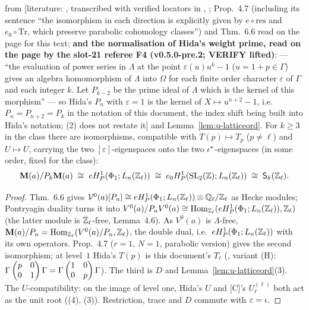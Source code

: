 \documentclass[11pt]{article}
\newcommand{\LIT}[1]{\textsf{[literature: #1]}}   %
\newcommand{\VERIFYloc}{\textsf{VERIFY}}          %
\newcommand{\Iw}{\Lambda}                         %
\newcommand{\Pk}[1]{P_{#1}}                       %
\newcommand{\Zl}{\Z_\ell}
\newcommand{\Ql}{\Q_\ell}
\begin{document}
\begin{proposition}\label{prop:u-lmsymcontrol}
\PROVED{} from \LIT{\cite[Thm.~3.1, p.~562; Lemma~4.6, p.~571; Prop.~4.7, p.~572; Thm.~6.6, p.~590]{hida_invent}, transcribed with verified locators in \HA{thm:hidacontrol},
\HA{thm:hidaweight}; Prop.~4.7 (including its sentence ``the isomorphism in each direction is explicitly given by $e\circ\mathrm{res}$ and $e_0\circ\mathrm{Tr}$, which preserve parabolic
cohomology classes'') and Thm.~6.6 read on the page for this text; \textbf{and the normalisation of Hida's weight prime, read on the page by the slot-21 referee F4
(v0.5.0-pre.2; \VERIFYloc{} lifted)}: \cite[p.~545, Introduction]{hida_invent} --- ``the evaluation of power series in $\Lambda$ at the point $\varepsilon(u)u^{k}-1$ ($u=1+p\in\Gamma$)
gives an algebra homomorphism of $\Lambda$ into $\Omega$ for each finite order character $\varepsilon$ of $\Gamma$ and each integer $k$. Let $P_{k-2}$ be the prime ideal of $\Lambda$ which is
the kernel of this morphism'' --- so Hida's $P_n$ with $\varepsilon=1$ is the kernel of $X\mapsto u^{n+2}-1$, i.e.\ $P_n=\Pk{n+2}=\Pk{k}$ in the notation of this document, the index shift
being built into Hida's notation; \HA{thm:hidacontrol}(2) does not restate it} and Lemma~\ref{lem:u-latticeord}. For $k\ge3$ in the class there are isomorphisms, compatible with $T(p)\mapsto T_p$ ($p\ne\ell$) and $U\mapsto U$, carrying the two
$[\varepsilon]$-eigenspaces onto the two $\iota^{\ast}$-eigenspaces (in some order, fixed for the class):
\[
  \mathbf M(a)/\Pk{k}\mathbf M(a)\;\cong\;eH^{1}_{P}(\Phi_1;L_n(\Zl))\;\cong\;e_0H^{1}_{P}(\SL_2(\Z);L_n(\Zl))\;\cong\;\mathsf S_k(\Zl).
\]
\end{proposition}

\begin{proof}
Thm.~6.6 gives $\mathcal V^{0}(a)[P_n]\cong eH^{1}_{P}(\Phi_1;L_n(\Zl))\otimes\Ql/\Zl$ as Hecke modules; Pontryagin duality turns it into $V^{0}(a)/P_nV^{0}(a)\cong
\Hom_{\Zl}(eH^{1}_{P}(\Phi_1;L_n(\Zl)),\Zl)$ (the latter module is $\Zl$-free, Lemma~4.6). As $V^{0}(a)$ is $\Iw$-free, $\mathbf M(a)/P_n=\Hom_{\Zl}(V^{0}(a)/P_n,\Zl)$, the double dual,
i.e.\ $eH^{1}_{P}(\Phi_1;L_n(\Zl))$ with its own operators. Prop.~4.7 ($r=1$, $N=1$, parabolic version) gives the second isomorphism; at level~$1$ Hida's $T(p)$ is this document's $T_\ell$
(, variant (H): $\Gamma\begin{pmatrix} p & 0 \\ 0 & 1 \end{pmatrix}\Gamma=\Gamma\begin{pmatrix} 1 & 0 \\ 0 & p \end{pmatrix}\Gamma$). The third is $D$ and Lemma~\ref{lem:u-latticeord}(3). The $U$-compatibility: on the image of level one, Hida's $U$ and
[C]'s $U^{(\ell)}_\ell$ both act as the unit root ((4), (3)). Restriction, trace and $D$ commute with $\varepsilon=\iota$.
\end{proof}
\end{document}

